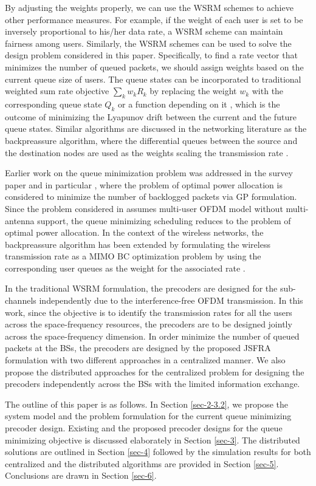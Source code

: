 By adjusting the weights properly, we can use the \ac{WSRM} schemes to achieve other performance measures. For example, if the weight of each user is set to be inversely proportional to his/her data rate, a \ac{WSRM} scheme can maintain fairness among users. Similarly, the \ac{WSRM} schemes can be used to solve the design problem considered in this paper. Specifically, to find a rate vector that minimizes the number of queued packets, we should assign weights based on the current queue size of users. The queue states can be incorporated to traditional weighted sum rate objective $\sum_k w_k R_k$ by replacing the weight $w_k$ with the corresponding queue state $Q_k$ or a function depending on it \cite{tassiulas,neely2010stochastic}, which is the outcome of minimizing the Lyapunov drift between the current and the future queue states. Similar algorithms are discussed in the networking literature as the backpreassure algorithm, where the differential queues between the source and the destination nodes are used as the weights scaling the transmission rate \cite{georgiadis2006resource}.

Earlier work on the queue minimization problem was addressed in the survey paper \cite{berry2004cross} and in particular \cite{qps_cioffi}, where the problem of optimal power allocation is considered to minimize the number of backlogged packets via \acl{GP} formulation. Since the problem considered in \cite{qps_cioffi} assumes multi-user \ac{OFDM} model without multi-antenna support, the queue minimizing scheduling reduces to the problem of optimal power allocation. In the context of the wireless networks, the backpreassure algorithm has been extended by formulating the wireless transmission rate as a \ac{MIMO} \ac{BC} optimization problem by using the corresponding user queues as the weight for the associated rate \cite{weeraddana2011resource}.

In the traditional \ac{WSRM} formulation, the precoders are designed for the sub-channels independently due to the interference-free \ac{OFDM} transmission. In this work, since the objective is to identify the transmission rates for all the users across the space-frequency resources, the precoders are to be designed jointly across the space-frequency dimension. In order minimize the number of queued packets at the \acp{BS}, the precoders are designed by the proposed \ac{JSFRA} formulation with two different approaches in a centralized manner. We also propose the distributed approaches for the centralized problem for designing the precoders independently across the \acp{BS} with the limited information exchange.

The outline of this paper is as follows. In Section \ref{sec-2-3.2}, we propose the system model and the problem formulation for the current queue minimizing precoder design. Existing and the proposed precoder designs for the queue minimizing objective is discussed elaborately in Section \ref{sec-3}. The distributed solutions are outlined in Section \ref{sec-4} followed by the simulation results for both centralized and the distributed algorithms are provided in Section \ref{sec-5}. Conclusions are drawn in Section \ref{sec-6}.